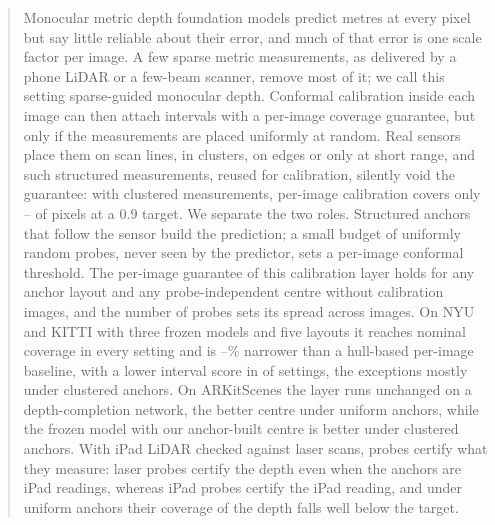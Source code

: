 \begin{abstract}
Monocular metric depth foundation models predict metres at every pixel but say little reliable about their error, and much of that error is one scale factor per image.
A few sparse metric measurements, as delivered by a phone LiDAR or a few-beam scanner, remove most of it; we call this setting sparse-guided monocular depth.
Conformal calibration inside each image can then attach intervals with a per-image coverage guarantee, but only if the measurements are placed uniformly at random.
Real sensors place them on scan lines, in clusters, on edges or only at short range, and such structured measurements, reused for calibration, silently void the guarantee: with clustered measurements, per-image calibration covers only \NumLocalClusterCovLo--\NumLocalClusterCovHi{} of pixels at a $0.9$ target.
We separate the two roles.
Structured anchors that follow the sensor build the prediction; a small budget of uniformly random probes, never seen by the predictor, sets a per-image conformal threshold.
The per-image guarantee of this calibration layer holds for any anchor layout and any probe-independent centre without calibration images, and the number of probes sets its spread across images.
On NYU and KITTI with three frozen models and five layouts it reaches nominal coverage in every setting and is \NumDualWidthGainLo--\NumDualWidthGainHi\% narrower than a hull-based per-image baseline, with a lower interval score in \NumDualISWins{} of \NumAllCells{} settings, the exceptions mostly under clustered anchors.
On ARKitScenes the layer runs unchanged on a depth-completion network, the better centre under uniform anchors, while the frozen model with our anchor-built centre is better under clustered anchors.
With iPad LiDAR checked against laser scans, probes certify what they measure: laser probes certify the depth even when the anchors are iPad readings, whereas iPad probes certify the iPad reading, and under uniform anchors their coverage of the depth falls well below the target.
\end{abstract}
